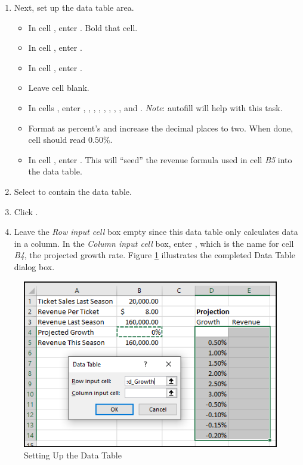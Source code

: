 \begin{enumerate}[resume]
	 
	\item Next, set up the data table area.

\begin{itemize}
	\item In cell , enter . Bold that cell.
	\item In cell , enter .
	\item In cell , enter .
	\item Leave cell  blank.
	\item In cells , enter , , , , , , , ,  and . \textit{Note}: autofill will help with this task.
	\item Format  as percent's and increase the decimal places to two. When done, cell  should read $ 0.50 $\%.
	\item In cell , enter . This will ``seed'' the revenue formula used in cell \textit{B5} into the data table.
\end{itemize}

	\item Select  to contain the data table.
	\item Click .
	\item Leave the \textit{Row input cell} box empty since this data table only calculates data in a column. In the \textit{Column input cell} box, enter , which is the name for cell \textit{B4}, the projected growth rate. Figure \ref{08:fig41} illustrates the completed Data Table dialog box.
	
\end{enumerate}

\begin{figure}[H]
	\centering
	\includegraphics[width=\maxwidth{.95\linewidth}]{gfx/ch08_fig41}
	\caption{Setting Up the Data Table}
	\label{08:fig41}
\end{figure}

